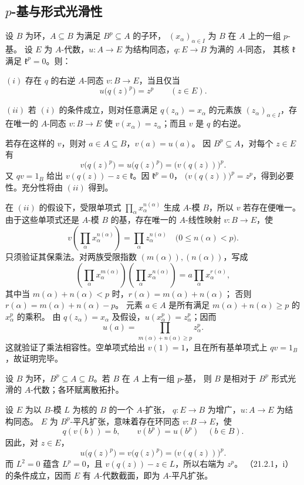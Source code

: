 \subsection{\texorpdfstring{$p$-基与形式光滑性}{p-基与形式光滑性}}
设 $B$ 为环，$A\subseteq B$ 为满足 $B^p\subseteq A$ 的子环，
$(x_\alpha)_{\alpha\in I}$ 为 $B$ 在 $A$ 上的一组 $p$-基。
设 $E$ 为 $A$-代数，$u:A\to E$ 为结构同态，$q:E\to B$ 为满的 $A$-同态，
其核 $\mathfrak k$ 满足 $\mathfrak k^p=0$。则：

$(i)$ 存在 $q$ 的右逆 $A$-同态 $v:B\to E$，当且仅当
\[
 u\bigl(q(z)^p\bigr)=z^p\qquad(z\in E).
\]

$(ii)$ 若 $(i)$ 的条件成立，则对任意满足 $q(z_\alpha)=x_\alpha$ 的元素族
$(z_\alpha)_{\alpha\in I}$，存在唯一的 $A$-同态 $v:B\to E$ 使
$v(x_\alpha)=z_\alpha$；而且 $v$ 是 $q$ 的右逆。

\eproof
若存在这样的 $v$，则对 $a\in A\subseteq B$，$v(a)=u(a)$。
因 $B^p\subseteq A$，对每个 $z\in E$ 有
\[
 v\bigl(q(z)^p\bigr)=u\bigl(q(z)^p\bigr)=\bigl(v(q(z))\bigr)^p.
\]
又 $qv=1_B$ 给出 $v(q(z))-z\in\mathfrak k$。因 $\mathfrak k^p=0$，
$\bigl(v(q(z))\bigr)^p=z^p$，得到必要性。充分性将由 $(ii)$ 得到。

在 $(ii)$ 的假设下，受限单项式 $\prod_\alpha x_\alpha^{n(\alpha)}$
生成 $A$-模 $B$，所以 $v$ 若存在便唯一。
由于这些单项式还是 $A$-模 $B$ 的基，存在唯一的 $A$-线性映射 $v:B\to E$，使
\[
 v\left(\prod_\alpha x_\alpha^{n(\alpha)}\right)
   =\prod_\alpha z_\alpha^{n(\alpha)}
 \quad\bigl(0\le n(\alpha)<p\bigr).
\]
只须验证其保乘法。对两族受限指数 $(m(\alpha)),(n(\alpha))$，写成
\[
 \left(\prod_\alpha x_\alpha^{m(\alpha)}\right)
 \left(\prod_\alpha x_\alpha^{n(\alpha)}\right)
 =a\prod_\alpha x_\alpha^{r(\alpha)},
\]
其中当 $m(\alpha)+n(\alpha)<p$ 时，$r(\alpha)=m(\alpha)+n(\alpha)$；
否则 $r(\alpha)=m(\alpha)+n(\alpha)-p$。
元素 $a\in A$ 是所有满足 $m(\alpha)+n(\alpha)\ge p$ 的 $x_\alpha^p$ 的乘积。
由 $q(z_\alpha)=x_\alpha$ 及假设，$u(x_\alpha^p)=z_\alpha^p$；因而
\[
 u(a)=\prod_{m(\alpha)+n(\alpha)\ge p}z_\alpha^p.
\]
这就验证了乘法相容性。空单项式给出 $v(1)=1$，且在所有基单项式上 $qv=1_B$，故证明完毕。
\finishproof

设 $B$ 为环，$B^p\subseteq A\subseteq B$。若 $B$ 在 $A$ 上有一组 $p$-基，
则 $B$ 是相对于 $B^p$ 形式光滑的 $A$-代数；各环赋离散拓扑。

\eproof
设 $E$ 为以 $B$-模 $L$ 为核的 $B$ 的一个 $A$-扩张，
$q:E\to B$ 为增广，$u:A\to E$ 为结构同态。
$E$ 为 $B^p$-平凡扩张，意味着存在环同态 $v:B\to E$，使
\[
 q(v(b))=b,\qquad v(b^p)=u(b^p)\quad(b\in B).
\]
因此，对 $z\in E$，
\[
 u\bigl(q(z)^p\bigr)=v\bigl(q(z)^p\bigr)=\bigl(v(q(z))\bigr)^p.
\]
而 $L^2=0$ 蕴含 $L^p=0$，且 $v(q(z))-z\in L$，所以右端为 $z^p$。
（21.2.1，i）的条件成立，因而 $E$ 有 $A$-代数截面，即为 $A$-平凡扩张。
\finishproof

